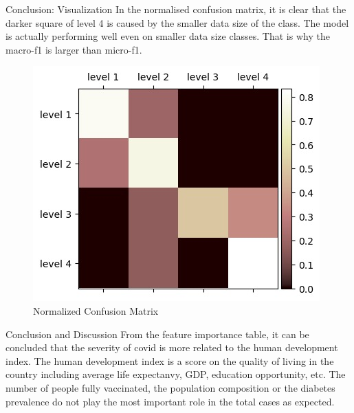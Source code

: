 \begin{frame}{Conclusion: Visualization}
In the normalised confusion matrix, it is clear that the darker square of level 4 is caused by the smaller data size of the class. The model is actually performing well even on smaller data size classes. That is why the macro-f1 is larger than micro-f1.

\begin{figure}[H]
    \centering
    \includegraphics[width=0.5\linewidth]{images/illustrate/normconfma.jpeg}
    \caption{Normalized Confusion Matrix}
    \end{figure}
\end{frame}

\begin{frame} {Conclusion and Discussion}
From the feature importance table, it can be concluded that the severity of covid is more related 
to the human development index. The human development index is a score on the quality of living in the 
country including average life expectanvy, GDP, education opportunity, etc. The number of people fully 
vaccinated, the population composition or the diabetes prevalence do not play the most important role 
in the total cases as expected.   
\end{frame}
